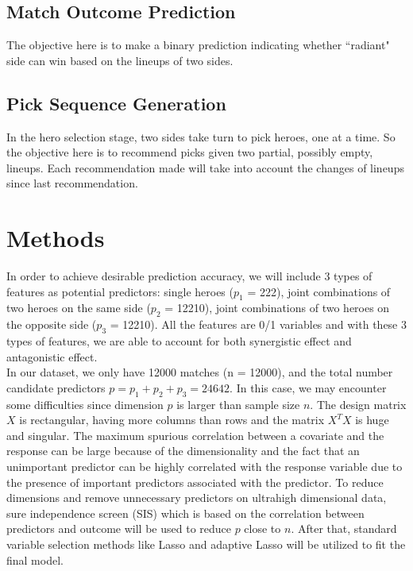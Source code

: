 \documentclass[11pt]{article}
\begin{document}
\subsection{Match Outcome Prediction}
The objective here is to make a binary prediction indicating whether ``radiant" side can win based on the lineups of two sides.

\subsection{Pick Sequence Generation}
In the hero selection stage, two sides take turn to pick heroes, one at a time. So the objective here is to recommend picks given two partial, possibly empty, lineups. Each recommendation made will take into account the changes of lineups since last recommendation.

\section{Methods}
In order to achieve desirable prediction accuracy, we will include 3 types of features as potential predictors: single heroes ($p_1$ = 222), joint combinations of two heroes on the same side ($p_2$ = 12210), joint combinations of two heroes on the opposite side ($p_3$ = 12210). All the features are 0/1 variables and with these 3 types of features, we are able to account for both synergistic effect and antagonistic effect.\\ 

\noindent In our dataset, we only have 12000 matches (n = 12000), and the total number candidate predictors $p = p_1 + p_2 + p_3 = 24642$. In this case, we may encounter some difficulties since dimension $p$ is larger than sample size $n$. The design matrix $X$ is rectangular, having more columns than rows and the matrix $X^TX$ is huge and singular. The maximum spurious correlation between a covariate and the response can be large because of the dimensionality and the fact that an unimportant predictor can be highly correlated with the response variable due to the presence of important predictors associated with the predictor. To reduce dimensions and remove unnecessary predictors on ultrahigh dimensional data, sure independence screen (SIS) which is based on the correlation between predictors and outcome \cite{SIS} will be used to reduce $p$ close to $n$. After that, standard variable selection methods like Lasso\cite{lasso} and adaptive Lasso\cite{adalasso} will be utilized to fit the final model. \\
\end{document}

